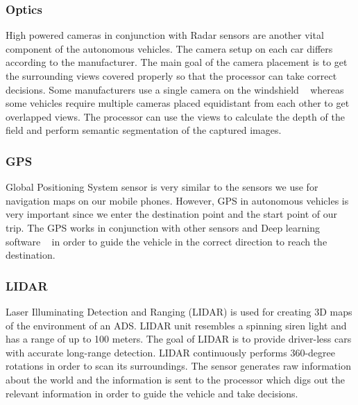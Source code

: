 \smallskip
\subsubsection{Optics}
High powered cameras in conjunction with Radar sensors are another vital component of the autonomous vehicles. The camera setup on each car differs according to the manufacturer. The main goal of the camera placement is to get the surrounding views covered properly so that the processor can take correct decisions. Some manufacturers use a single camera on the windshield ~\cite{singlecamera} whereas some vehicles require multiple cameras placed equidistant from each other to get overlapped views. The processor can use the views to calculate the depth of the field and perform semantic segmentation of the captured images.

\smallskip
\subsubsection{GPS}
Global Positioning System sensor is very similar to the sensors we use for navigation maps on our mobile phones. However, GPS in autonomous vehicles is very important since we enter the destination point and the start point of our trip. The GPS works in conjunction with other sensors and Deep learning software ~\cite{GPS} in order to guide the vehicle in the correct direction to reach the destination.

\smallskip
\subsubsection{LIDAR}
Laser Illuminating Detection and Ranging (LIDAR) is used for creating 3D maps of the environment of an ADS. LIDAR unit resembles a spinning siren light and has a range of up to 100 meters. The goal of LIDAR is to provide driver-less cars with accurate long-range detection. LIDAR continuously performs 360-degree rotations in order to scan its surroundings. The sensor generates raw information about the world and the information is sent to the processor which digs out the relevant information in order to guide the vehicle and take decisions.

